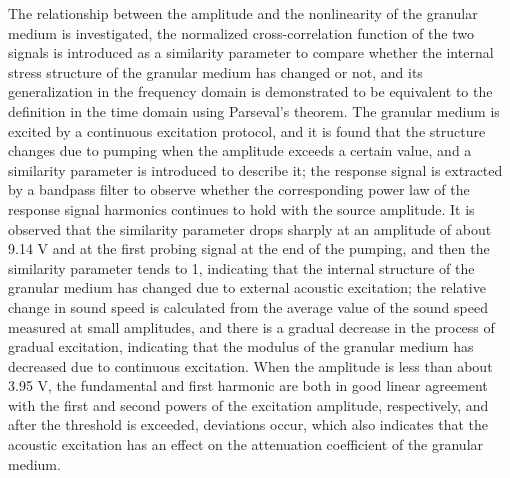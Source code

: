 \begin{digest}

    The relationship between the amplitude and the nonlinearity of the granular medium is investigated, the normalized cross-correlation function of the two signals is introduced as a similarity parameter to compare whether the internal stress structure of the granular medium has changed or not, and its generalization in the frequency domain is demonstrated to be equivalent to the definition in the time domain using Parseval's theorem.
    The granular medium is excited by a continuous excitation protocol, and it is found that the structure changes due to pumping when the amplitude exceeds a certain value, and a similarity parameter is introduced to describe it; the response signal is extracted by a bandpass filter to observe whether the corresponding power law of the response signal harmonics continues to hold with the source amplitude.
    It is observed that the similarity parameter drops sharply at an amplitude of about 9.14 \unit{\volt} and at the first probing signal at the end of the pumping, and then the similarity parameter tends to 1, indicating that the internal structure of the granular medium has changed due to external acoustic excitation; the relative change in sound speed is calculated from the average value of the sound speed measured at small amplitudes, and there is a gradual decrease in the process of gradual excitation, indicating that the modulus of the granular medium has decreased due to continuous excitation.
    When the amplitude is less than about 3.95 \unit{\volt}, the fundamental and first harmonic are both in good linear agreement with the first and second powers of the excitation amplitude, respectively, and after the threshold is exceeded, deviations occur, which also indicates that the acoustic excitation has an effect on the attenuation coefficient of the granular medium.



\end{digest}
